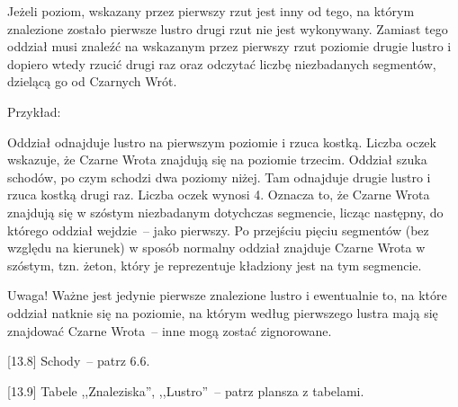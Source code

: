 Jeżeli poziom, wskazany przez pierwszy rzut jest inny od tego, na którym znalezione zostało pierwsze lustro drugi rzut nie jest wykonywany.
Zamiast tego oddział musi znaleźć na wskazanym przez pierwszy rzut poziomie drugie lustro i dopiero wtedy rzucić drugi raz oraz odczytać liczbę niezbadanych segmentów, dzielącą go od Czarnych Wrót.

Przykład:

Oddział odnajduje lustro na pierwszym poziomie i rzuca kostką.
Liczba oczek wskazuje, że Czarne Wrota znajdują się na poziomie trzecim.
Oddział szuka schodów, po czym schodzi dwa poziomy niżej.
Tam odnajduje drugie lustro i rzuca kostką drugi raz.
Liczba oczek wynosi 4.
Oznacza to, że Czarne Wrota znajdują się w szóstym niezbadanym dotychczas segmencie, licząc następny, do którego oddział wejdzie~-- jako pierwszy.
Po przejściu pięciu segmentów (bez względu na kierunek) w sposób normalny oddział znajduje Czarne Wrota w szóstym, tzn. żeton, który je reprezentuje kładziony jest na tym segmencie.

Uwaga! Ważne jest jedynie pierwsze znalezione lustro i ewentualnie to, na które oddział natknie się na poziomie, na którym według pierwszego lustra mają się znajdować Czarne Wrota~-- inne mogą zostać zignorowane.

[13.8] Schody~-- patrz 6.6.

[13.9] Tabele ,,Znaleziska'', ,,Lustro''~-- patrz plansza z tabelami.
